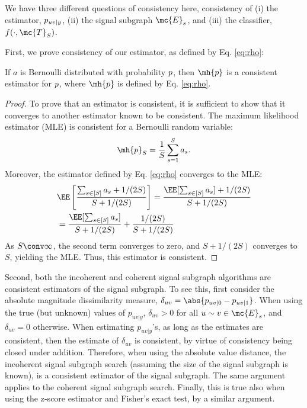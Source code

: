 We have three different questions of consistency here, consistency of (i) the estimator, $p_{uv|y}$, (ii) the signal subgraph $\mc{E}_s$, and (iii) the classifier, $f(\cdot, \mc{T}_S)$.

First, we prove consistency of our estimator, as defined by Eq. \eqref{eq:rho}:

\begin{thm}
If $a$ is Bernoulli distributed with probability $p$, then
$\mh{p}$ is a consistent estimator for $p$, where $\mh{p}$ is defined by Eq. \eqref{eq:rho}.
\end{thm}

\begin{proof}
	
To prove that an estimator is consistent, it is sufficient to show that it converges to another estimator known to be consistent.  The maximum likelihood estimator (MLE) is consistent for a Bernoulli random variable:
\begin{align} \label{eq:bern}
	\mh{p}_S = \frac{1}{S} \sum_{s=1}^S a_s.
\end{align}
Moreover, the estimator defined by Eq. \eqref{eq:rho} converges to the MLE:
\begin{align}
	&\EE\left[\frac{\sum_{s\in[S]} a_s+ 1/(2S)}{S + 1/(2S)}\right] = \frac{\EE[\sum_{s\in[S]} a_s] + 1/(2S)}{S + 1/(2S)} \nonumber\\&= \frac{\EE[\sum_{s\in[S]} a_s]}{S + 1/(2S)} + \frac{1/(2S)}{S + 1/(2S)} 
\end{align}
As $S\conv\infty$, the second term converges to zero, and $S+1/(2S)$ converges to $S$, yielding the MLE.  Thus, this estimator is consistent.
\end{proof}


Second, both the incoherent and coherent signal subgraph algorithms are consistent estimators of the signal subgraph.  To see this, first consider the absolute magnitude dissimilarity measure, $\delta_{uv}=\abs{p_{uv|0}-p_{uv|1}}$.  When using the true (but unknown) values of $p_{uv|y}$, $\delta_{uv} > 0$ for all $u\sim v \in \mc{E}_s$, and $\delta_{uv}=0$ otherwise.  When estimating $p_{uv|y}$'s, as long as the estimates are consistent, then the estimate of $\delta_{uv}$ is consistent, by virtue of consistency being closed under addition.  Therefore, when using the absolute value distance, the incoherent signal subgraph search (assuming the size of the signal subgraph is known), is a consistent estimator of the signal subgraph.  The same argument applies to the coherent signal subgraph search.  Finally, this is true also when using the z-score estimator and Fisher's exact test, by a similar argument.  

